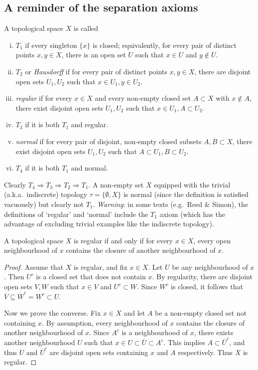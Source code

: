 \subsection{A reminder of the separation axioms}
\begin{definition}
	A topological space $X$ is called
	\begin{enumerate}[(i)]
		\item $T_1$ if every singleton $\{x\}$ is closed; equivalently, for every pair of distinct points $x,y \in X$, there is an open set $U$ such that $x \in U$ and $y \not\in U$.
		\item $T_2$ or \emph{Hausdorff} if for every pair of distinct points $x,y \in X$, there are disjoint open sets $U_1, U_2$ such that $x \in U_1, y \in U_2$.
		\item \emph{regular} if for every $x \in X$ and every non-empty closed set $A \subset X$ with $x \not\in A$, there exist disjoint open sets $U_1, U_2$ such that $x \in U_1, A \subset U_2$.
		\item $T_3$ if it is both $T_1$ and regular.
		\item \emph{normal} if for every pair of disjoint, non-empty closed subsets $A, B \subset X$, there exist disjoint open sets $U_1, U_2$ such that $A \subset U_1, B \subset U_2$.
		\item $T_4$ if it is both $T_1$ and normal.
	\end{enumerate}
\end{definition}

Clearly $T_4 \Rightarrow T_3 \Rightarrow T_2 \Rightarrow T_1$. A non-empty set $X$ equipped with the trivial (a.k.a.\ indiscrete) topology $\tau = \{ \emptyset, X \}$ is normal (since the definition is satisfied vacuously) but clearly not $T_1$. \emph{Warning}: in some texts (e.g.\ Reed \& Simon), the definitions of `regular' and `normal' include the $T_1$ axiom (which has the advantage of excluding trivial examples like the indiscrete topology).

\begin{proposition}
	A topological space $X$ is regular if and only if for every $x \in X$, every open neighbourhood of $x$ contains the closure of another neighbourhood of $x$.
\end{proposition}

\begin{proof}
	Assume that $X$ is regular, and fix $x \in X$. Let $U$ be any neighbourhood of $x$. Then $U^c$ is a closed set that does not contain $x$. By regularity, there are disjoint open sets $V, W$ such that $x \in V$ and $U^c \subset W$. Since $W^c$ is closed, it follows that $\overline{V} \subseteq \overline{W}^c = W^c \subset U$.
	
	Now we prove the converse. Fix $x \in X$ and let $A$ be a non-empty closed set not containing $x$. By assumption, every neighbourhood of $x$ contains the closure of another neighbourhood of $x$. Since $A^c$ is a neighbourhood of $x$, there exists another neighbourhood $U$ such that $x \in U \subset \overline{U} \subset A^c$. This implies $A \subset \overline{U}^c$, and thus $U$ and $\overline{U}^c$ are disjoint open sets containing $x$ and $A$ respectively. Thus $X$ is regular.
\end{proof}

